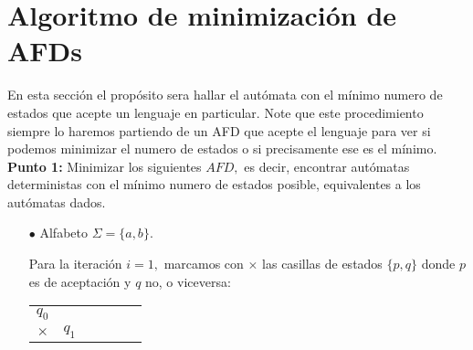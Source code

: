 \section{Algoritmo de minimización de AFDs}

En esta sección el propósito sera hallar el autómata con el mínimo numero de estados que acepte un lenguaje en particular. Note que este procedimiento siempre lo haremos partiendo de un AFD que acepte el lenguaje para ver si podemos minimizar el numero de estados o si precisamente ese es el mínimo.\\

\textbf{Punto 1: }Minimizar los siguientes $AFD,$ es decir, encontrar autómatas deterministas con el mínimo numero de estados posible, equivalentes a los autómatas dados.
\begin{itemize}
    \item[$\bullet$] Alfabeto $\Sigma=\{a,b\}.$
        \begin{center}
            \end{center} 
    Para la iteración $i=1,$ marcamos con $\times$ las casillas de estados $\{p,q\}$  donde $p$ es de aceptación y $q$ no, o viceversa:
    \begin{center}
        \begin{tabular}{ cccccc}
        $q_0$& & & & & \\ \cline{1-1}
        \multicolumn{1}{|c|}{$\times$} &$q_1$ & & & & \\ \cline{1-2}

\end{tabular}
\end{center}
\end{itemize}
